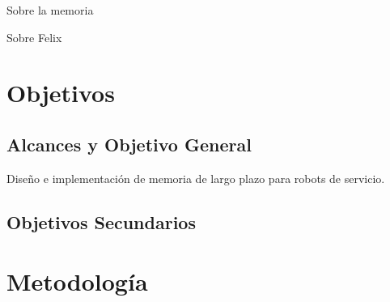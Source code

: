 \documentclass[12pt,letterpaper,spanish]{article}
\begin{document}
Sobre la memoria \cite{Eichenbaum:2008}

Sobre Felix

\newpage
\section{Objetivos}

\subsection{Alcances y Objetivo General}

Dise\~no e implementaci\'on de memoria de largo plazo para robots de servicio.


\subsection{Objetivos Secundarios}

\newpage
\section{Metodolog\'ia}

\newpage



\end{document}
